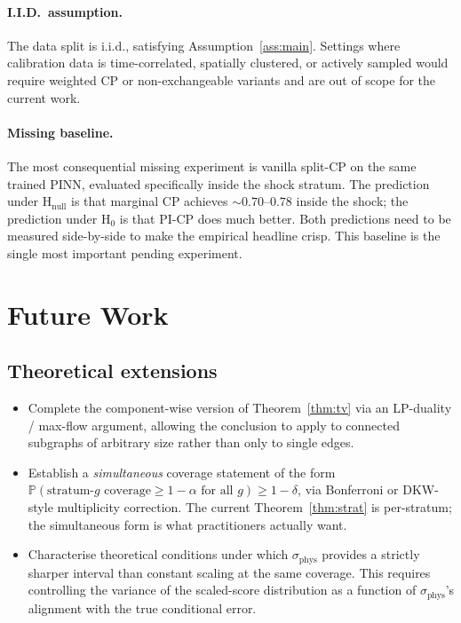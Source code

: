 \documentclass[11pt]{article}
\theoremstyle{definition}
\theoremstyle{remark}
\newcommand{\PP}{\mathbb{P}}
\newcommand{\sphys}{\sigma_{\mathrm{phys}}}
\begin{document}
\paragraph{I.I.D.\ assumption.} The data split is i.i.d., satisfying Assumption~\ref{ass:main}. Settings where calibration data is time-correlated, spatially clustered, or actively sampled would require weighted CP or non-exchangeable variants and are out of scope for the current work.

\paragraph{Missing baseline.} The most consequential missing experiment is vanilla split-CP on the same trained PINN, evaluated specifically inside the shock stratum. The prediction under H$_{\text{null}}$ is that marginal CP achieves $\sim 0.70$--$0.78$ inside the shock; the prediction under H$_0$ is that PI-CP does much better. Both predictions need to be measured side-by-side to make the empirical headline crisp. This baseline is the single most important pending experiment.

\section{Future Work}
\label{sec:future}

\subsection{Theoretical extensions}

\begin{itemize}[leftmargin=*,topsep=2pt,itemsep=2pt]
    \item Complete the component-wise version of Theorem~\ref{thm:tv} via an LP-duality / max-flow argument, allowing the conclusion to apply to connected subgraphs of arbitrary size rather than only to single edges.
    \item Establish a \emph{simultaneous} coverage statement of the form $\PP(\text{stratum-$g$ coverage} \geq 1-\alpha \text{ for all } g) \geq 1 - \delta$, via Bonferroni or DKW-style multiplicity correction. The current Theorem~\ref{thm:strat} is per-stratum; the simultaneous form is what practitioners actually want.
    \item Characterise theoretical conditions under which $\sphys$ provides a strictly sharper interval than constant scaling at the same coverage. This requires controlling the variance of the scaled-score distribution as a function of $\sphys$'s alignment with the true conditional error.
\end{itemize}
\end{document}
